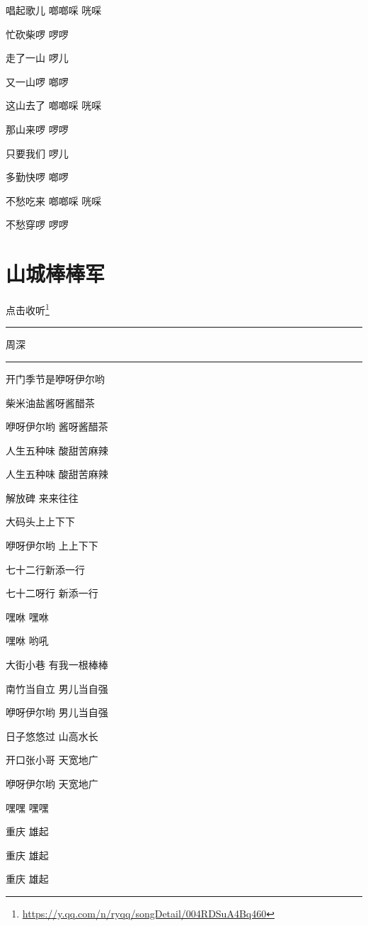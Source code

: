 \documentclass[]{ctexbook}
\renewcommand{\href}[2]{#2\footnote{\url{#1}}}
\begin{document}
唱起歌儿 啷啷啋 咣啋

忙砍柴啰 啰啰

走了一山 啰儿

又一山啰 啷啰

这山去了 啷啷啋 咣啋

那山来啰 啰啰

只要我们 啰儿

多勤快啰 啷啰

不愁吃来 啷啷啋 咣啋

不愁穿啰 啰啰

\section*{山城棒棒军}\label{nice-chongqing}


\href{https://y.qq.com/n/ryqq/songDetail/004RDSuA4Bq460}{点击收听}

\begin{center}\rule{0.5\linewidth}{0.5pt}\end{center}

周深

\begin{center}\rule{0.5\linewidth}{0.5pt}\end{center}

开门季节是咿呀伊尔哟

柴米油盐酱呀酱醋茶

咿呀伊尔哟 酱呀酱醋茶

人生五种味 酸甜苦麻辣

人生五种味 酸甜苦麻辣

解放碑 来来往往

大码头上上下下

咿呀伊尔哟 上上下下

七十二行新添一行

七十二呀行 新添一行

嘿咻 嘿咻

嘿咻 哟吼

大街小巷 有我一根棒棒

南竹当自立 男儿当自强

咿呀伊尔哟 男儿当自强

日子悠悠过 山高水长

开口张小哥 天宽地广

咿呀伊尔哟 天宽地广

嘿嘿 嘿嘿

重庆 雄起

重庆 雄起

重庆 雄起
\end{document}
